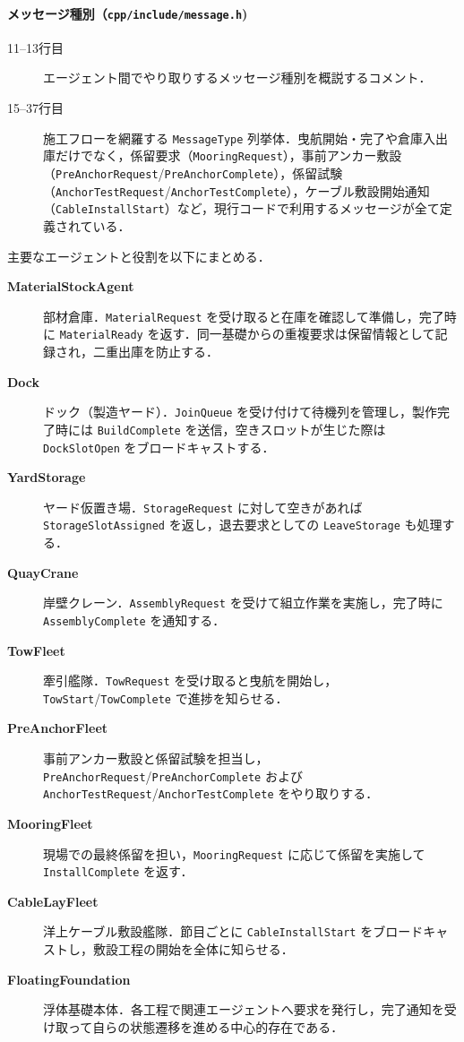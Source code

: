 \documentclass[10pt,letterpaper]{jsarticle}
\begin{document}
\paragraph{メッセージ種別（\texttt{cpp/include/message.h})}

\begin{description}
  \item[11--13行目] エージェント間でやり取りするメッセージ種別を概説するコメント．
  \item[15--37行目] 施工フローを網羅する \texttt{MessageType} 列挙体．曳航開始・完了や倉庫入出庫だけでなく，係留要求（\texttt{MooringRequest}），事前アンカー敷設（\texttt{PreAnchorRequest}/\texttt{PreAnchorComplete}），係留試験（\texttt{AnchorTestRequest}/\texttt{AnchorTestComplete}），ケーブル敷設開始通知（\texttt{CableInstallStart}）など，現行コードで利用するメッセージが全て定義されている．
\end{description}

主要なエージェントと役割を以下にまとめる．
\begin{description}
  \item[\textbf{MaterialStockAgent}] 部材倉庫．\texttt{MaterialRequest} を受け取ると在庫を確認して準備し，完了時に \texttt{MaterialReady} を返す．同一基礎からの重複要求は保留情報として記録され，二重出庫を防止する．
  \item[\textbf{Dock}] ドック（製造ヤード）．\texttt{JoinQueue} を受け付けて待機列を管理し，製作完了時には \texttt{BuildComplete} を送信，空きスロットが生じた際は \texttt{DockSlotOpen} をブロードキャストする．
  \item[\textbf{YardStorage}] ヤード仮置き場．\texttt{StorageRequest} に対して空きがあれば \texttt{StorageSlotAssigned} を返し，退去要求としての \texttt{LeaveStorage} も処理する．
  \item[\textbf{QuayCrane}] 岸壁クレーン．\texttt{AssemblyRequest} を受けて組立作業を実施し，完了時に \texttt{AssemblyComplete} を通知する．
  \item[\textbf{TowFleet}] 牽引艦隊．\texttt{TowRequest} を受け取ると曳航を開始し，\texttt{TowStart}/\texttt{TowComplete} で進捗を知らせる．
  \item[\textbf{PreAnchorFleet}] 事前アンカー敷設と係留試験を担当し，\texttt{PreAnchorRequest}/\texttt{PreAnchorComplete} および \texttt{AnchorTestRequest}/\texttt{AnchorTestComplete} をやり取りする．
  \item[\textbf{MooringFleet}] 現場での最終係留を担い，\texttt{MooringRequest} に応じて係留を実施して \texttt{InstallComplete} を返す．
  \item[\textbf{CableLayFleet}] 洋上ケーブル敷設艦隊．節目ごとに \texttt{CableInstallStart} をブロードキャストし，敷設工程の開始を全体に知らせる．
  \item[\textbf{FloatingFoundation}] 浮体基礎本体．各工程で関連エージェントへ要求を発行し，完了通知を受け取って自らの状態遷移を進める中心的存在である．
\end{description}
\end{document}
